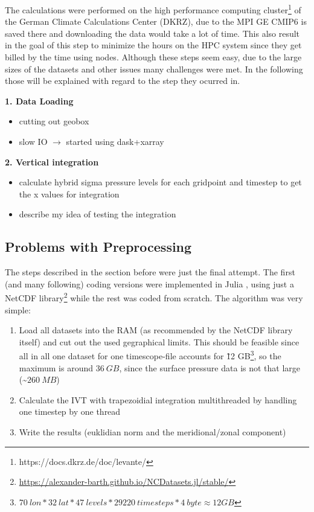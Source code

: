The calculations were performed on the high performance computing cluster\footnote{https://docs.dkrz.de/doc/levante/} of the German Climate Calculations Center (DKRZ), due to the MPI GE CMIP6 is saved there and downloading the data would take a lot of time. 
This also result in the goal of this step to minimize the hours on the HPC system since they get billed by the time using nodes. 
Although these steps seem easy, due to the large sizes of the datasets and other issues many challenges were met. 
In the following those will be explained with regard to the step they ocurred in. 



\textbf{1. Data Loading}

\begin{itemize}
  \item cutting out geobox
  \item slow IO $\rightarrow$ started using dask+xarray 
\end{itemize}

\textbf{2. Vertical integration}

\begin{itemize}
  \item calculate hybrid  sigma pressure levels for each gridpoint and timestep to get the x values for integration
  \item describe my idea of testing the integration
  
\end{itemize}

\subsection{Problems with Preprocessing}

The steps described in the section before were just the final attempt. 
The first (and many following) coding versions were implemented in Julia \cite{gao_julia_2020}, using just a NetCDF library\footnote{\url{https://alexander-barth.github.io/NCDatasets.jl/stable/}} while the rest was coded from scratch. 
The algorithm was very simple: 

\begin{enumerate}[itemsep=0mm]
  \item Load all datasets into the RAM (as recommended by the NetCDF library itself) and cut out the used gegraphical limits. This should be feasible since all in all one dataset for one timescope-file accounts for \~12 GB\footnote{$70~lon * 32~lat * 47~levels * 29220~timesteps * 4~byte \approx 12 GB$}, so the maximum is around $36~GB$, since the surface pressure data is not that large (\~$260~MB$)   
  \item Calculate the IVT with trapezoidial integration multithreaded by handling one timestep by one thread
  \item Write the results (euklidian norm and the meridional/zonal component)
\end{enumerate}

